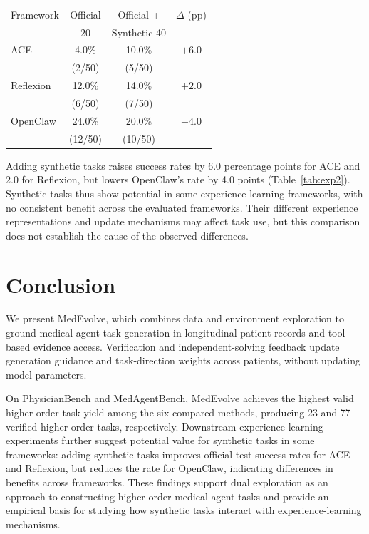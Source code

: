 \documentclass[11pt]{article}
\begin{document}
\par\medskip\noindent
\begin{minipage}{\columnwidth}
\centering
\small
\setlength{\tabcolsep}{3pt}
\begin{tabular}{@{}lccc@{}}
\toprule
Framework & Official & Official + & $\Delta$ (pp) \\
 & 20 & Synthetic 40 & \\
\midrule
ACE & 4.0\% & 10.0\% & $+6.0$ \\
 & (2/50) & (5/50) & \\
Reflexion & 12.0\% & 14.0\% & $+2.0$ \\
 & (6/50) & (7/50) & \\
OpenClaw & 24.0\% & 20.0\% & $-4.0$ \\
 & (12/50) & (10/50) & \\
\bottomrule
\end{tabular}
\label{tab:exp2}
\end{minipage}
\par\medskip

Adding synthetic tasks raises success rates by 6.0 percentage points for ACE and 2.0 for Reflexion, but lowers OpenClaw's rate by 4.0 points (Table~\ref{tab:exp2}). Synthetic tasks thus show potential in some experience-learning frameworks, with no consistent benefit across the evaluated frameworks. Their different experience representations and update mechanisms may affect task use, but this comparison does not establish the cause of the observed differences.

\raggedbottom

\section{Conclusion}

We present MedEvolve, which combines data and environment exploration to ground medical agent task generation in longitudinal patient records and tool-based evidence access. Verification and independent-solving feedback update generation guidance and task-direction weights across patients, without updating model parameters.

On PhysicianBench and MedAgentBench, MedEvolve achieves the highest valid higher-order task yield among the six compared methods, producing 23 and 77 verified higher-order tasks, respectively. Downstream experience-learning experiments further suggest potential value for synthetic tasks in some frameworks: adding synthetic tasks improves official-test success rates for ACE and Reflexion, but reduces the rate for OpenClaw, indicating differences in benefits across frameworks. These findings support dual exploration as an approach to constructing higher-order medical agent tasks and provide an empirical basis for studying how synthetic tasks interact with experience-learning mechanisms.
\end{document}
